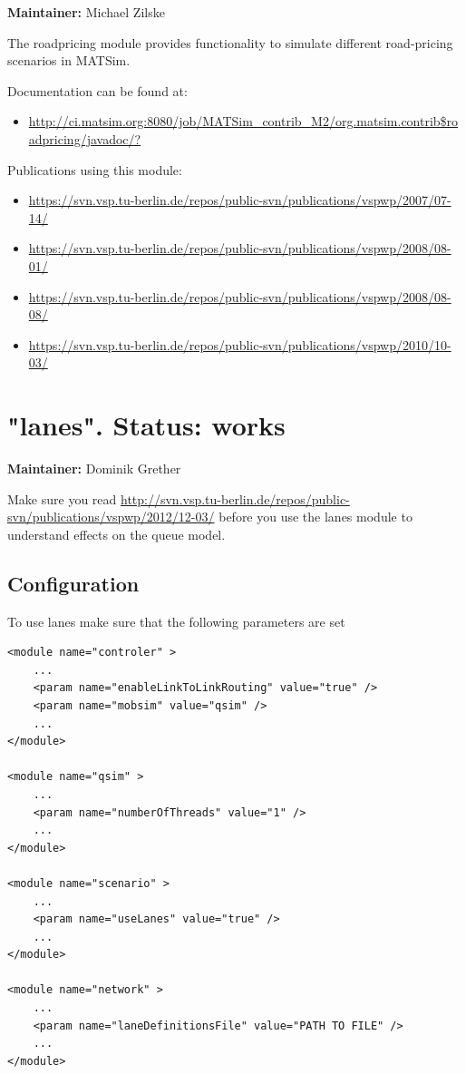\textbf{Maintainer:} Michael Zilske

The roadpricing module provides functionality to simulate different road-pricing scenarios in MATSim.

Documentation can be found at:
\begin{itemize}
	\item \href{http://ci.matsim.org:8080/job/MATSim_contrib_M2/org.matsim.contrib$roadpricing/javadoc/?}{http://ci.matsim.org:8080/job/MATSim\_contrib\_M2/org.matsim.contrib\$roadpricing/javadoc/?}
\end{itemize}

Publications using this module:
\begin{itemize}
	\item \href{https://svn.vsp.tu-berlin.de/repos/public-svn/publications/vspwp/2007/07-14/}{https://svn.vsp.tu-berlin.de/repos/public-svn/publications/vspwp/2007/07-14/}
	\item \href{https://svn.vsp.tu-berlin.de/repos/public-svn/publications/vspwp/2008/08-01/}{https://svn.vsp.tu-berlin.de/repos/public-svn/publications/vspwp/2008/08-01/}
	\item \href{https://svn.vsp.tu-berlin.de/repos/public-svn/publications/vspwp/2008/08-08/}{https://svn.vsp.tu-berlin.de/repos/public-svn/publications/vspwp/2008/08-08/}
	\item \href{https://svn.vsp.tu-berlin.de/repos/public-svn/publications/vspwp/2010/10-03/}{https://svn.vsp.tu-berlin.de/repos/public-svn/publications/vspwp/2010/10-03/}
\end{itemize}


\vfill\eject
\section{"lanes". Status: works}

\textbf{Maintainer:} Dominik Grether

Make sure you read \url{http://svn.vsp.tu-berlin.de/repos/public-svn/publications/vspwp/2012/12-03/} before you use the lanes module to understand effects on the queue model.

\subsection{Configuration}

To use lanes make sure that the following parameters are set

\begin{verbatim}
<module name="controler" >	
	...
	<param name="enableLinkToLinkRouting" value="true" />
	<param name="mobsim" value="qsim" />
	...
</module>

<module name="qsim" >
	...
	<param name="numberOfThreads" value="1" />
	...
</module>

<module name="scenario" >
	...
	<param name="useLanes" value="true" />
	...
</module>

<module name="network" >
	...
	<param name="laneDefinitionsFile" value="PATH TO FILE" />
	...
</module>
\end{verbatim}

